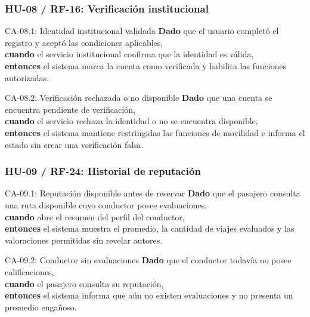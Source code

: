 \documentclass[12pt,a4paper]{article}
\begin{document}
\subsubsection{HU-08 / RF-16: Verificación institucional}

\begin{GherkinBox}{CA-08.1: Identidad institucional validada}
\textbf{Dado} que el usuario completó el registro y aceptó las condiciones aplicables,\\
\textbf{cuando} el servicio institucional confirma que la identidad es válida,\\
\textbf{entonces} el sistema marca la cuenta como verificada y habilita las funciones autorizadas.
\end{GherkinBox}

\begin{GherkinBox}{CA-08.2: Verificación rechazada o no disponible}
\textbf{Dado} que una cuenta se encuentra pendiente de verificación,\\
\textbf{cuando} el servicio rechaza la identidad o no se encuentra disponible,\\
\textbf{entonces} el sistema mantiene restringidas las funciones de movilidad e informa el estado sin crear una verificación falsa.
\end{GherkinBox}

\subsubsection{HU-09 / RF-24: Historial de reputación}

\begin{GherkinBox}{CA-09.1: Reputación disponible antes de reservar}
\textbf{Dado} que el pasajero consulta una ruta disponible cuyo conductor posee evaluaciones,\\
\textbf{cuando} abre el resumen del perfil del conductor,\\
\textbf{entonces} el sistema muestra el promedio, la cantidad de viajes evaluados y las valoraciones permitidas sin revelar autores.
\end{GherkinBox}

\begin{GherkinBox}{CA-09.2: Conductor sin evaluaciones}
\textbf{Dado} que el conductor todavía no posee calificaciones,\\
\textbf{cuando} el pasajero consulta su reputación,\\
\textbf{entonces} el sistema informa que aún no existen evaluaciones y no presenta un promedio engañoso.
\end{GherkinBox}
\end{document}
